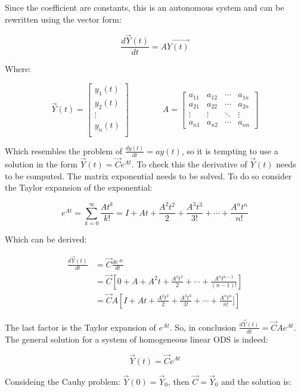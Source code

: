   Since the coefficient are constants, this is an autonomous system and can be rewritten using the vector form:

  $$\frac{d\vec{Y}(t)}{dt} = A\vec{Y(t)}$$

  Where:

  $$\vec{Y}(t) = \begin{bmatrix} y_1(t)\\ y_2(t)\\ \vdots\\ y_n(t)\\ \end{bmatrix} \qquad\qquad A = \begin{bmatrix} a_{11} & a_{12} & \cdots & a_{1n}\\a_{21} & a_{22} & \cdots & a_{2n}\\ \vdots & \vdots & \ddots & \vdots \\ a_{n1} & a_{n2} & \cdots & a_{nn}\end{bmatrix}$$

  Which resembles the problem of $\frac{dy(t)}{dt} = ay(t)$, so it is tempting to use a solution in the form $\vec{Y}(t) = \vec{C}e^{A t}$.
  To check this the derivative of $\vec{Y}(t)$ needs to be computed.
  The matrix exponential needs to be solved.
  To do so consider the Taylor expansion of the exponential:

  $$e^{At} = \sum\limits_{k=0}^\infty\frac{{At}^k}{k!} = I + At + \frac{A^2t^2}{2} + \frac{A^3t^3}{3!} + \cdots + \frac{A^nt^n}{n!}$$

  Which can be derived:

  \begin{align*}
    \frac{d\vec{Y}(t)}{dt} &= \vec{C}\frac{de^{At}}{dt}\\
                           &= \vec{C}\left[0 + A + A^2t + \frac{A^3t^2}{2} + \cdots + \frac{A^nt^{n-1}}{(n-1)!}\right]\\
                           &= \vec{C}A\left[I + At + \frac{A^2t^2}{2} + \frac{A^3t^3}{3!} + \cdots + \frac{A^nt^n}{n!}]\right]
  \end{align*}

  The last factor is the Taylor expansion of $e^{At}$.
  So, in conclusion $\frac{d\vec{Y}(t)}{dt} = \vec{C}Ae^{At}$.
  The general solution for a system of homogeneous linear ODS is indeed:

  $$\vec{Y}(t) = \vec{C}e^{At}$$

  Consideing the Cauhy problem: $\vec{Y}(0) = \vec{Y}_0$, then $\vec{C} = \vec{Y}_0$ and the solution is:

